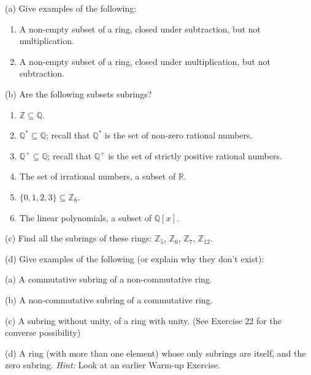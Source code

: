 \begin{problem}[Warmup]{(a)}
    Give examples of the following:
    \begin{enumerate}
        \item[(a)] A non-empty subset of a ring, closed under subtraction, but not multiplication.
        \item[(b)] A non-empty subset of a ring, closed under multiplication, but not subtraction.
    \end{enumerate}
\end{problem}
\unsolved

\begin{problem}[Warmup]{(b)}
    Are the following subsets subrings?
    \begin{enumerate}
        \item[(a)] $\mathbb{Z} \subseteq \mathbb{Q}$.
        \item[(b)] $\mathbb{Q}^* \subseteq \mathbb{Q}$; recall that $\mathbb{Q}^*$ is the set of non-zero rational numbers.
        \item[(c)] $\mathbb{Q}^+ \subseteq \mathbb{Q}$; recall that $\mathbb{Q}^+$ is the set of strictly positive rational numbers.
        \item[(d)] The set of irrational numbers, a subset of $\mathbb{R}$.
        \item[(e)] $\{0, 1, 2, 3\} \subseteq \mathbb{Z}_8$.
        \item[(f)] The linear polynomials, a subset of $\mathbb{Q}[x]$.
    \end{enumerate}
\end{problem}
\unsolved

\begin{problem}[Warmup]{(c)}
    Find all the subrings of these rings: $\mathbb{Z}_5$, $\mathbb{Z}_6$, $\mathbb{Z}_7$, $\mathbb{Z}_{12}$.
\end{problem}
\unsolved

\begin{problem}[Warmup]{(d)}
    Give examples of the following (or explain why they don't exist):

    (a) A commutative subring of a non-commutative ring.

    (b) A non-commutative subring of a commutative ring.

    (c) A subring without unity, of a ring with unity. (See 
        Exercise 22 for the converse possibility)

    (d) A ring (with more than one element) whose only subrings are itself,
        and the zero subring. \emph{Hint:} Look at an earlier Warm-up Exercise.
\end{problem}
\solved

